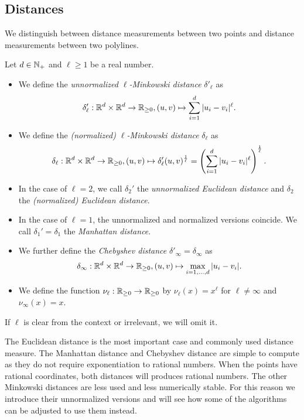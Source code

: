\subsection{Distances}
\label{ssec:distances}
We distinguish between distance measurements between two points and distance measurements between two polylines. 
\begin{definition}[Distances]\label{def:point_distance}
  Let \(d \in \mathbb{N}_+\) and \(\ell \geq 1\) be a real number.
  \begin{itemize}
    \item We define the \emph{unnormalized \(\ell\)-Minkowski distance} \(\delta'_\ell\) as 
      \[\delta'_\ell:\mathbb{R}^d \times \mathbb{R}^d \to \mathbb{R}_{\geq 0}, (u, v) \mapsto \sum_{i = 1}^d |u_i - v_i|^\ell.\]
    \item We define the \emph{(normalized) \(\ell\)-Minkowski distance} \(\delta_\ell\) as 
      \[\delta_\ell:\mathbb{R}^d \times \mathbb{R}^d \to \mathbb{R}_{\geq 0}, (u, v) \mapsto \delta'_\ell(u, v)^{\frac1\ell} = \left(\sum_{i = 1}^d |u_i - v_i|^\ell\right)^{\frac1\ell}.\]
    \item In the case of \(\ell = 2\), we call \(\delta_2'\)  the \emph{unnormalized Euclidean distance} and \(\delta_2\) the \emph{(normalized) Euclidean distance}.
    \item In the case of \(\ell = 1\), the unnormalized and normalized versions coincide. We call \(\delta_1' = \delta_1\) the \emph{Manhattan distance}. 
    \item We further define the \emph{Chebyshev distance} \(\delta'_\infty = \delta_\infty\) as 
      \[\delta_\infty:\mathbb{R}^d \times \mathbb{R}^d \to \mathbb{R}_{\geq 0}, (u, v) \mapsto \max_{i = 1, \dots, d} |u_i - v_i|.\]
    \item We define the function \(\nu_\ell:\mathbb{R}_{\geq 0} \to \mathbb{R}_{\geq 0}\) by \(\nu_\ell(x) = x^\ell\) for \(\ell \neq \infty\) and \(\nu_\infty(x) = x\).
  \end{itemize}

  If \(\ell\) is clear from the context or irrelevant, we will omit it.
\end{definition}

The Euclidean distance is the most important case and commonly used distance measure. The Manhattan distance and Chebyshev distance are simple to compute as they do not require exponentiation to rational numbers. When the points have rational coordinates, both distances will produces rational numbers.
The other Minkowski distances are less used and less numerically stable. For this reason we introduce their unnormalized versions and will see how some of the algorithms can be adjusted to use them instead. 


